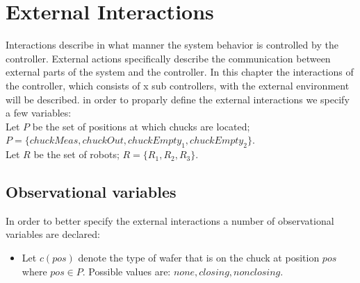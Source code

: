 \section{External Interactions}
Interactions describe in what manner the system behavior is controlled by the controller.
External actions specifically describe the communication between external parts of the system and the controller.
In this chapter the interactions of the controller, which consists of x sub controllers, with the external environment will be described. in order to proparly define the external interactions we specify a few variables:
\\Let $P$ be the set of positions at which chucks are located; $P = \{chuckMeas, chuckOut, chuckEmpty_1, chuckEmpty_2\}$.
\\Let $R$ be the set of robots; $R = \{R_1,R_2,R_3\}$.

\subsection{Observational variables}
In order to better specify the external interactions a number of observational variables are declared:
\begin{itemize}
\item Let $c(pos)$ denote the type of wafer that is on the chuck at position $pos$ where $pos \in P$. Possible values are: $none, closing, nonclosing$.
\end{itemize}
